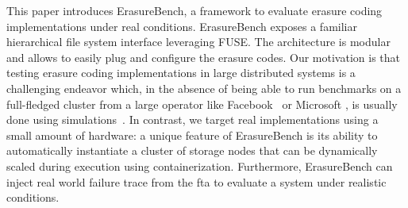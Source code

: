 



This paper introduces ErasureBench, a framework to evaluate erasure coding implementations under real conditions. 
ErasureBench exposes a familiar hierarchical file system interface leveraging FUSE.
The architecture is modular and allows to easily plug and configure the erasure codes.
Our motivation is that testing erasure coding implementations in large distributed systems is a challenging endeavor which, in the absence of being able to run benchmarks on a full-fledged cluster from a large operator like Facebook~\autocite{XorbasVLDB} or Microsoft \cite{DBLP:conf/usenix/HuangSXOCG0Y12}, is usually done using simulations~\autocite{Silberstein2014}. 
In contrast, we target real implementations using a small amount of hardware: a unique feature of ErasureBench is its ability to automatically instantiate a cluster of storage nodes that can be dynamically scaled during execution using containerization. %
Furthermore, ErasureBench can inject real world failure trace from the \ac{fta} \autocite{fta-journal} to evaluate a system under realistic conditions. 

